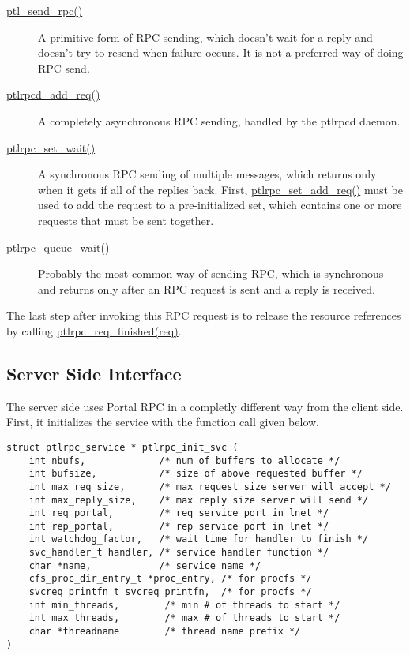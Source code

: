 \begin{description}

\item[\url{ptl_send_rpc()}] A primitive form of RPC sending, which doesn't wait
for a reply and doesn't try to resend when failure occurs. It is not a preferred
way of doing RPC send.

\item[\url{ptlrpcd_add_req()}] A completely asynchronous RPC sending, handled
by the ptlrpcd daemon.

\item[\url{ptlrpc_set_wait()}] A synchronous RPC sending of multiple messages,
which returns only when it gets if all of the replies back. First,
\url{ptlrpc_set_add_req()} must be used to add the request to a pre-initialized
set, which contains one or more requests that must be sent together. 

\item[\url{ptlrpc_queue_wait()}] Probably the most common way of sending RPC,
which is synchronous and returns only after an RPC request is sent and a reply is
received.

\end{description}

The last step after invoking this RPC request is to release the resource
references by calling \url{ptlrpc_req_finished(req)}.

\subsection{Server Side Interface}

The server side uses Portal RPC in a completly different way from the
client side. First, it initializes the service with the function call given
below.

\begin{Verbatim}
struct ptlrpc_service * ptlrpc_init_svc (
    int nbufs,             /* num of buffers to allocate */
    int bufsize,           /* size of above requested buffer */ 
    int max_req_size,      /* max request size server will accept */
    int max_reply_size,    /* max reply size server will send */ 
    int req_portal,        /* req service port in lnet */
    int rep_portal,        /* rep service port in lnet */
    int watchdog_factor,   /* wait time for handler to finish */
    svc_handler_t handler, /* service handler function */
    char *name,            /* service name */
    cfs_proc_dir_entry_t *proc_entry, /* for procfs */
    svcreq_printfn_t svcreq_printfn,  /* for procfs */
    int min_threads,        /* min # of threads to start */
    int max_threads,        /* max # of threads to start */
    char *threadname        /* thread name prefix */
)
\end{Verbatim}

